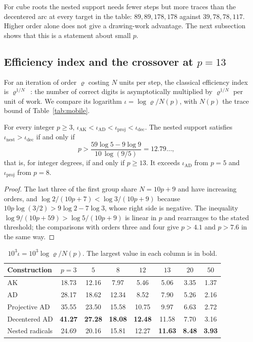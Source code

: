 For cube roots the nested support needs fewer steps but more traces than the decentered arc at every
target in the table: $89,89,178,178$ against $39,78,78,117$. Higher order alone does not give a
drawing-work advantage. The next subsection shows that this is a statement about small $p$.

\subsection{Efficiency index and the crossover at \texorpdfstring{$p=13$}{p = 13}}

For an iteration of order $\varrho$ costing $N$ units per step, the classical efficiency index is
$\varrho^{1/N}$~\cite{ostrowski,traub64}: the number of correct digits is asymptotically multiplied by
$\varrho^{1/N}$ per unit of work. We compare its logarithm $\iota=\log\varrho/N(p)$, with $N(p)$ the
trace bound of Table~\ref{tab:mobile}.

\begin{proposition}\label{prop:index}
For every integer $p\ge3$, $\iota_{\mathrm{AK}}<\iota_{\mathrm{AD}}<\iota_{\mathrm{proj}}<\iota_{\mathrm{dec}}$.
The nested support satisfies $\iota_{\mathrm{nest}}>\iota_{\mathrm{dec}}$ if and only if
\[ p>\frac{59\log5-9\log9}{10\,\log(9/5)}=12.79\ldots, \]
that is, for integer degrees, if and only if $p\ge13$. It exceeds $\iota_{\mathrm{AD}}$ from $p=5$ and
$\iota_{\mathrm{proj}}$ from $p=8$.
\end{proposition}
\begin{proof}
The last three of the first group share $N=10p+9$ and have increasing orders, and
$\log2/(10p+7)<\log3/(10p+9)$ because $10p\log(3/2)>9\log2-7\log3$, whose right side is negative. The
inequality $\log9/(10p+59)>\log5/(10p+9)$ is linear in $p$ and rearranges to the stated threshold; the
comparisons with orders three and four give $p>4.1$ and $p>7.6$ in the same way.
\end{proof}

\begin{table}[h]
\centering\small
\caption{$10^{3}\iota=10^{3}\log\varrho/N(p)$. The largest value in each column is in bold.}\label{tab:index}
\begin{tabular}{@{}lccccccc@{}}
\toprule
Construction & $p=3$ & $5$ & $8$ & $12$ & $13$ & $20$ & $50$\\
\midrule
AK & 18.73 & 12.16 & 7.97 & 5.46 & 5.06 & 3.35 & 1.37\\
AD & 28.17 & 18.62 & 12.34 & 8.52 & 7.90 & 5.26 & 2.16\\
Projective AD & 35.55 & 23.50 & 15.58 & 10.75 & 9.97 & 6.63 & 2.72\\
Decentered AD & \textbf{41.27} & \textbf{27.28} & \textbf{18.08} & \textbf{12.48} & 11.58 & 7.70 & 3.16\\
Nested radicals & 24.69 & 20.16 & 15.81 & 12.27 & \textbf{11.63} & \textbf{8.48} & \textbf{3.93}\\
\bottomrule
\end{tabular}
\end{table}

